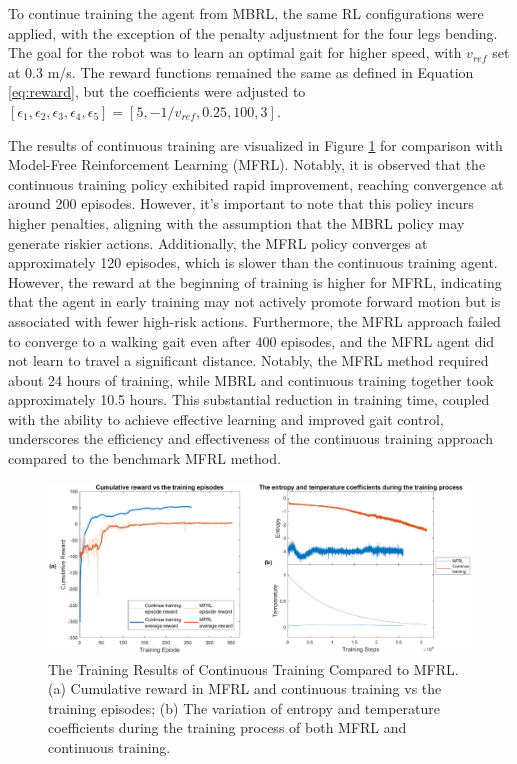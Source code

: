 To continue training the agent from MBRL, the same RL configurations were applied, with the exception of the penalty adjustment for the four legs bending. The goal for the robot was to learn an optimal gait for higher speed, with $v_{ref}$ set at 0.3 m/s. The reward functions remained the same as defined in Equation \ref{eq:reward}, but the coefficients were adjusted to $[\epsilon_1, \epsilon_2, \epsilon_3, \epsilon_4, \epsilon_5] = [5, −1/v_{ref}, 0.25, 100, 3]$. 

The results of continuous training are visualized in Figure \ref{fig:MFRLvsCT} for comparison with Model-Free Reinforcement Learning (MFRL). Notably, it is observed that the continuous training policy exhibited rapid improvement, reaching convergence at around 200 episodes. However, it's important to note that this policy incurs higher penalties, aligning with the assumption that the MBRL policy may generate riskier actions. Additionally, the MFRL policy converges at approximately 120 episodes, which is slower than the continuous training agent. However, the reward at the beginning of training is higher for MFRL, indicating that the agent in early training may not actively promote forward motion but is associated with fewer high-risk actions. Furthermore, the MFRL approach failed to converge to a walking gait even after 400 episodes, and the MFRL agent did not learn to travel a significant distance. Notably, the MFRL method required about 24 hours of training, while MBRL and continuous training together took approximately 10.5 hours. This substantial reduction in training time, coupled with the ability to achieve effective learning and improved gait control, underscores the efficiency and effectiveness of the continuous training approach compared to the benchmark MFRL method.
\begin{figure}[htb]
    \centering
    \includegraphics[width=\linewidth]{img/chap5/MFRLvsCT.eps}
    \caption{The Training Results of Continuous Training Compared to MFRL. (a) Cumulative reward in MFRL and continuous training vs the training episodes; (b) The variation of entropy and temperature coefficients during the training process of both MFRL and continuous training.}
    \label{fig:MFRLvsCT}
\end{figure}

